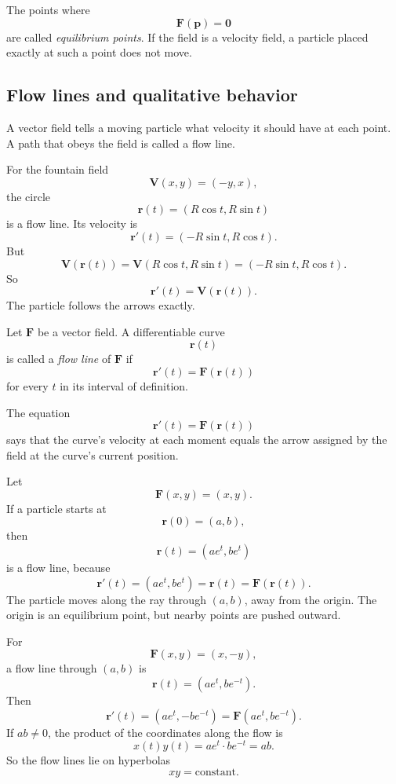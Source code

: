 The points where
\[
    \mathbf F(\mathbf p)=\mathbf 0
\]
are called \emph{equilibrium points}.  If the field is a velocity field, a particle placed
exactly at such a point does not move.

\subsection{Flow lines and qualitative behavior}

A vector field tells a moving particle what velocity it should have at each point.
A path that obeys the field is called a flow line.

For the fountain field
\[
    \mathbf V(x,y)=(-y,x),
\]
the circle
\[
    \mathbf r(t)=(R\cos t,R\sin t)
\]
is a flow line.  Its velocity is
\[
    \mathbf r'(t)=(-R\sin t,R\cos t).
\]
But
\[
    \mathbf V(\mathbf r(t))
    =
    \mathbf V(R\cos t,R\sin t)
    =
    (-R\sin t,R\cos t).
\]
So
\[
    \mathbf r'(t)=\mathbf V(\mathbf r(t)).
\]
The particle follows the arrows exactly.

\begin{definition}
Let \(\mathbf F\) be a vector field.  A differentiable curve
\[
    \mathbf r(t)
\]
is called a \emph{flow line} of \(\mathbf F\) if
\[
\boxed{
    \mathbf r'(t)=\mathbf F(\mathbf r(t))
}
\]
for every \(t\) in its interval of definition.
\end{definition}

The equation
\[
    \mathbf r'(t)=\mathbf F(\mathbf r(t))
\]
says that the curve's velocity at each moment equals the arrow assigned by the field
at the curve's current position.

\begin{example}
Let
\[
    \mathbf F(x,y)=(x,y).
\]
If a particle starts at
\[
    \mathbf r(0)=(a,b),
\]
then
\[
    \mathbf r(t)=(ae^t,be^t)
\]
is a flow line, because
\[
    \mathbf r'(t)=(ae^t,be^t)=\mathbf r(t)=\mathbf F(\mathbf r(t)).
\]
The particle moves along the ray through \((a,b)\), away from the origin.  The origin
is an equilibrium point, but nearby points are pushed outward.
\end{example}

\begin{example}
For
\[
    \mathbf F(x,y)=(x,-y),
\]
a flow line through \((a,b)\) is
\[
    \mathbf r(t)=(ae^t,be^{-t}).
\]
Then
\[
    \mathbf r'(t)=(ae^t,-be^{-t})
    =
    \mathbf F(ae^t,be^{-t}).
\]
If \(ab\ne0\), the product of the coordinates along the flow is
\[
    x(t)y(t)=ae^t\cdot be^{-t}=ab.
\]
So the flow lines lie on hyperbolas
\[
    xy=\text{constant}.
\]
\end{example}

